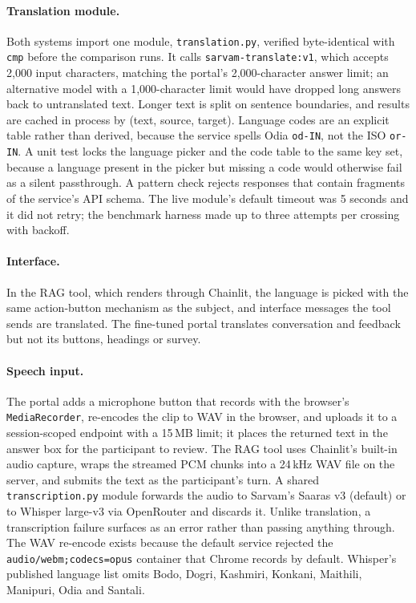 \documentclass[pdflatex,sn-mathphys-num]{sn-jnl}%
\theoremstyle{thmstyleone}%
\theoremstyle{thmstyletwo}%
\theoremstyle{thmstylethree}%
\begin{document}
\begin{appendices}
\paragraph{Translation module.} Both systems import one module, \texttt{translation.py}, verified
byte-identical with \texttt{cmp} before the comparison runs. It calls \texttt{sarvam-translate:v1},
which accepts 2,000 input characters, matching the portal's 2,000-character answer limit; an
alternative model with a 1,000-character limit would have dropped long answers back to untranslated
text. Longer text is split on sentence boundaries, and results are cached in process by (text,
source, target). Language codes are an explicit table rather than derived, because the service spells
Odia \texttt{od-IN}, not the ISO \texttt{or-IN}. A unit test locks the language picker and the code
table to the same key set, because a language present in the picker but missing a code would
otherwise fail as a silent passthrough. A pattern check rejects responses that contain fragments of
the service's API schema. The live module's default timeout was 5 seconds and it did not retry; the
benchmark harness made up to three attempts per crossing with backoff.

\paragraph{Interface.} In the RAG tool, which renders through Chainlit, the language is picked with
the same action-button mechanism as the subject, and interface messages the tool sends are translated.
The fine-tuned portal translates conversation and feedback but not its buttons, headings or survey.

\paragraph{Speech input.} The portal adds a microphone button that records with the browser's
\texttt{MediaRecorder}, re-encodes the clip to WAV in the browser, and uploads it to a session-scoped
endpoint with a 15\,MB limit; it places the returned text in the answer box for the participant to
review. The RAG tool uses Chainlit's built-in audio capture, wraps the streamed PCM chunks into a
24\,kHz WAV file on the server, and submits the text as the participant's turn. A shared
\texttt{transcription.py} module forwards the audio to Sarvam's Saaras v3 (default) or to Whisper
large-v3 via OpenRouter and discards it. Unlike translation, a transcription failure surfaces as an
error rather than passing anything through. The WAV re-encode exists because the default service
rejected the \texttt{audio/webm;codecs=opus} container that Chrome records by default. Whisper's
published language list omits Bodo, Dogri, Kashmiri, Konkani, Maithili, Manipuri, Odia and Santali.


\end{appendices}
\end{document}
